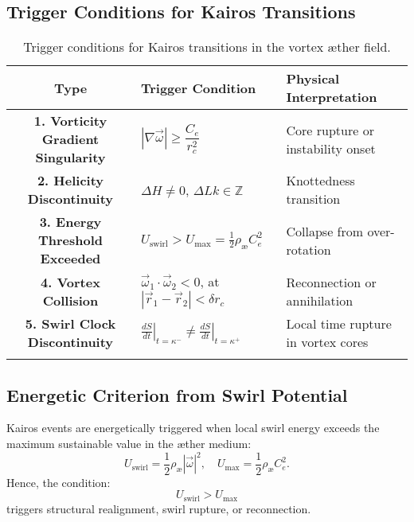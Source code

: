 \documentclass[12pt]{article}
\begin{document}
    \subsection{Trigger Conditions for Kairos Transitions}
\begin{eqbox}
    \begin{table}[H]
        \centering
        \footnotesize
        \renewcommand{\arraystretch}{1.4}
        \begin{tabular}{|c|l|l|}
            \hline
            \textbf{Type} & \textbf{Trigger Condition} & \textbf{Physical Interpretation} \\
            \hline
            \textbf{1. Vorticity Gradient Singularity} &
            $|\nabla \vec{\omega}| \geq \dfrac{C_e}{r_c^2}$ &
            Core rupture or instability onset \\
            \textbf{2. Helicity Discontinuity} &
            $\Delta H \neq 0$, $\Delta Lk \in \mathbb{Z}$ &
            Knottedness transition \\
            \textbf{3. Energy Threshold Exceeded} &
            $U_{\text{swirl}} > U_{\text{max}} = \frac{1}{2} \rho_{\text{\ae}} C_e^2$ &
            Collapse from over-rotation \\
            \textbf{4. Vortex Collision} &
            $\vec{\omega}_1 \cdot \vec{\omega}_2 < 0$, at $|\vec{r}_1 - \vec{r}_2| < \delta r_c$ &
            Reconnection or annihilation \\
            \textbf{5. Swirl Clock Discontinuity} &
            $\left.\frac{dS}{dt}\right|_{t = \kappa^-} \neq \left.\frac{dS}{dt}\right|_{t = \kappa^+}$ &
            Local time rupture in vortex cores \\
            & & \\
            \hline
        \end{tabular}
        \caption{Trigger conditions for Kairos transitions in the vortex æther field.}\label{tab:table}
    \end{table}
\end{eqbox}

    \subsection{Energetic Criterion from Swirl Potential}
    Kairos events are energetically triggered when local swirl energy exceeds the maximum sustainable value in the æther medium:
    \begin{equation}
        U_{\text{swirl}} = \frac{1}{2} \rho_{\text{\ae}} |\vec{\omega}|^2,
        \quad
        U_{\text{max}} = \frac{1}{2} \rho_{\text{\ae}} C_e^2.
    \end{equation}
    Hence, the condition:
    \[
        U_{\text{swirl}} > U_{\text{max}}
    \]
    triggers structural realignment, swirl rupture, or reconnection.
\end{document}
